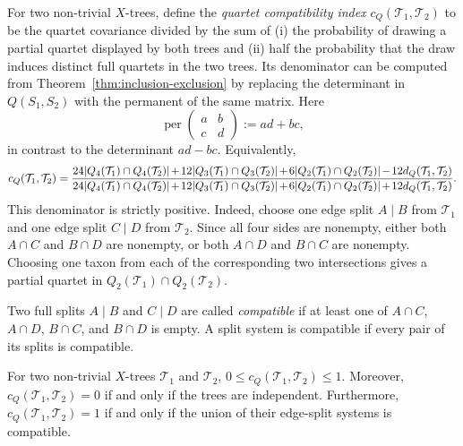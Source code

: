 \documentclass[12pt]{article}
\begin{document}
For two non-trivial $X$-trees, define the \emph{quartet compatibility index}
$c_Q(\mathcal T_1,\mathcal T_2)$ to be the quartet covariance divided by the
sum of (i) the probability of drawing a partial quartet displayed by both
trees and (ii) half the probability that the draw induces distinct full
quartets in the two trees.  Its
denominator can be computed from Theorem~\ref{thm:inclusion-exclusion}
by replacing the determinant in $Q(S_1,S_2)$ with the permanent of the
same matrix.  Here
\begin{equation}\label{eq:permanent-definition}
\operatorname{per}\!\begin{pmatrix}a&b\\c&d\end{pmatrix}:=ad+bc,
\end{equation}
in contrast to the determinant $ad-bc$.  Equivalently,
\begingroup\footnotesize
\begin{equation}\label{eq:compatibility-index}
c_Q(\mathcal T_1,\mathcal T_2)=
\frac{
24|Q_4(\mathcal T_1)\cap Q_4(\mathcal T_2)|
\mkern-2mu+\mkern-2mu12|Q_3(\mathcal T_1)\cap Q_3(\mathcal T_2)|
\mkern-2mu+\mkern-2mu6|Q_2(\mathcal T_1)\cap Q_2(\mathcal T_2)|
\mkern-2mu-\mkern-2mu12d_Q(\mathcal T_1,\mathcal T_2)
}{
24|Q_4(\mathcal T_1)\cap Q_4(\mathcal T_2)|
\mkern-2mu+\mkern-2mu12|Q_3(\mathcal T_1)\cap Q_3(\mathcal T_2)|
\mkern-2mu+\mkern-2mu6|Q_2(\mathcal T_1)\cap Q_2(\mathcal T_2)|
\mkern-2mu+\mkern-2mu12d_Q(\mathcal T_1,\mathcal T_2)
}.
\end{equation}
\endgroup
This denominator is strictly positive.  Indeed, choose one edge split
$A\mid B$ from $\mathcal T_1$ and one edge split $C\mid D$ from
$\mathcal T_2$.  Since all four sides are nonempty, either both
$A\cap C$ and $B\cap D$ are nonempty, or both $A\cap D$ and $B\cap C$ are
nonempty.  Choosing one taxon from each of the corresponding two
intersections gives a partial quartet in
$Q_2(\mathcal T_1)\cap Q_2(\mathcal T_2)$.

Two full splits $A\mid B$ and $C\mid D$ are called \emph{compatible} if
at least one of $A\cap C$, $A\cap D$, $B\cap C$, and $B\cap D$ is empty.
A split system is compatible if every pair of its splits is compatible.

\begin{proposition}\label{prop:compatibility}
For two non-trivial $X$-trees $\mathcal T_1$ and $\mathcal T_2$,
$0\le c_Q(\mathcal T_1,\mathcal T_2)\le1$.  Moreover,
$c_Q(\mathcal T_1,\mathcal T_2)=0$ if and only if the trees are
independent.  Furthermore, $c_Q(\mathcal T_1,\mathcal T_2)=1$ if and only if
the union of their edge-split systems is compatible.
\end{proposition}
\end{document}
